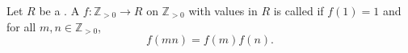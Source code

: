 \begin{definition} \label{definition:completely_multiplicative_function_on_positive_integers_with_values_in_a_ring}
Let $R$ be a . A  $f: \mathbb{Z}_{>0} \to R$ on $\mathbb{Z}_{>0}$ with values in $R$ is called  if $f(1) = 1$ and for all $m, n \in \mathbb{Z}_{>0}$,
$$f(mn) = f(m)f(n).$$
\end{definition}
